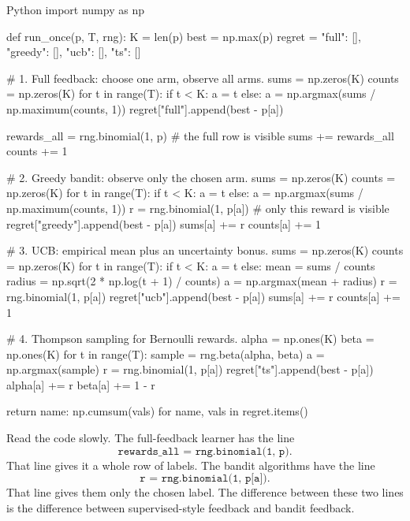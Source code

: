 \documentclass[en,nofont,11pt]{elegantbook}
\begin{document}
\begin{codeblock}[title={A minimal reproducible simulation for full feedback, greedy bandits, UCB, and Thompson sampling.}]{Python}
import numpy as np

def run_once(p, T, rng):
    K = len(p)
    best = np.max(p)
    regret = {"full": [], "greedy": [], "ucb": [], "ts": []}

    # 1. Full feedback: choose one arm, observe all arms.
    sums = np.zeros(K)
    counts = np.zeros(K)
    for t in range(T):
        if t < K:
            a = t
        else:
            a = np.argmax(sums / np.maximum(counts, 1))
        regret["full"].append(best - p[a])

        rewards_all = rng.binomial(1, p)   # the full row is visible
        sums += rewards_all
        counts += 1

    # 2. Greedy bandit: observe only the chosen arm.
    sums = np.zeros(K)
    counts = np.zeros(K)
    for t in range(T):
        if t < K:
            a = t
        else:
            a = np.argmax(sums / np.maximum(counts, 1))
        r = rng.binomial(1, p[a])          # only this reward is visible
        regret["greedy"].append(best - p[a])
        sums[a] += r
        counts[a] += 1

    # 3. UCB: empirical mean plus an uncertainty bonus.
    sums = np.zeros(K)
    counts = np.zeros(K)
    for t in range(T):
        if t < K:
            a = t
        else:
            mean = sums / counts
            radius = np.sqrt(2 * np.log(t + 1) / counts)
            a = np.argmax(mean + radius)
        r = rng.binomial(1, p[a])
        regret["ucb"].append(best - p[a])
        sums[a] += r
        counts[a] += 1

    # 4. Thompson sampling for Bernoulli rewards.
    alpha = np.ones(K)
    beta = np.ones(K)
    for t in range(T):
        sample = rng.beta(alpha, beta)
        a = np.argmax(sample)
        r = rng.binomial(1, p[a])
        regret["ts"].append(best - p[a])
        alpha[a] += r
        beta[a] += 1 - r

    return {name: np.cumsum(vals) for name, vals in regret.items()}
\end{codeblock}

Read the code slowly. The full-feedback learner has the line
\[
\texttt{rewards\_all = rng.binomial(1, p)}.
\]
That line gives it a whole row of labels. The bandit algorithms have the line
\[
\texttt{r = rng.binomial(1, p[a])}.
\]
That line gives them only the chosen label. The difference between these two lines is the difference between supervised-style feedback and bandit feedback.
\end{document}
